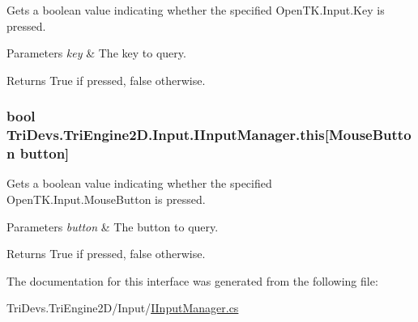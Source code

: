 Gets a boolean value indicating whether the specified Open\-T\-K.\-Input.\-Key is pressed. 


\begin{DoxyParams}{Parameters}
{\em key} & The key to query.\\
\hline
\end{DoxyParams}
\begin{DoxyReturn}{Returns}
True if pressed, false otherwise.
\end{DoxyReturn}
\hypertarget{interface_tri_devs_1_1_tri_engine2_d_1_1_input_1_1_i_input_manager_a1ab67e0dc3518f968641893310d47db1}{
\subsubsection[{this[Mouse\-Button button]}]{\setlength{\rightskip}{0pt plus 5cm}bool Tri\-Devs.\-Tri\-Engine2\-D.\-Input.\-I\-Input\-Manager.\-this\mbox{[}Mouse\-Button button\mbox{]}\hspace{0.3cm}{\ttfamily [get]}}}\label{interface_tri_devs_1_1_tri_engine2_d_1_1_input_1_1_i_input_manager_a1ab67e0dc3518f968641893310d47db1}


Gets a boolean value indicating whether the specified Open\-T\-K.\-Input.\-Mouse\-Button is pressed. 


\begin{DoxyParams}{Parameters}
{\em button} & The button to query.\\
\hline
\end{DoxyParams}
\begin{DoxyReturn}{Returns}
True if pressed, false otherwise.
\end{DoxyReturn}


The documentation for this interface was generated from the following file\-:\begin{DoxyCompactItemize}
\item 
Tri\-Devs.\-Tri\-Engine2\-D/\-Input/\hyperlink{_i_input_manager_8cs}{I\-Input\-Manager.\-cs}\end{DoxyCompactItemize}
